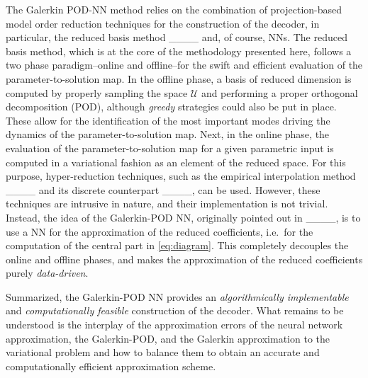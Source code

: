 The Galerkin POD-NN method relies on the combination
of projection-based model order reduction techniques
for the construction of the decoder, in particular, the reduced basis method ____ and, of course, NNs.
The reduced basis method, which is at the core of the methodology presented here, follows a two phase paradigm--online
and offline--for the swift and efficient evaluation of the
parameter-to-solution map.
In the offline phase, a basis of
reduced dimension is computed by properly sampling the space $\mathcal{U}$ and performing
a proper orthogonal decomposition (POD), although \emph{greedy} strategies could also be put in place. 
These allow for the identification of the most important modes driving the dynamics of the parameter-to-solution map.
Next, in the online phase, the evaluation of the parameter-to-solution map for a given parametric input is computed in a variational fashion as an element of the reduced space. For this purpose,
hyper-reduction techniques, such as the empirical interpolation method ____ and its discrete counterpart
____, can be used. However, these techniques are intrusive in nature, and their implementation is not trivial. Instead, the idea of the Galerkin-POD NN, originally pointed out in ____, is to use a NN for the approximation of the reduced coefficients,
i.e.~for the computation of the central part in \cref{eq:diagram}. This completely decouples the online and offline phases, and makes the approximation of the reduced coefficients purely \emph{data-driven}.

Summarized, the Galerkin-POD NN provides an \emph{algorithmically implementable} and \emph{computationally feasible} construction of the decoder. What remains to be understood is the interplay of the approximation errors of the neural network approximation, the Galerkin-POD, and the Galerkin approximation to the variational problem and how to balance them to obtain an accurate and computationally efficient approximation scheme.
